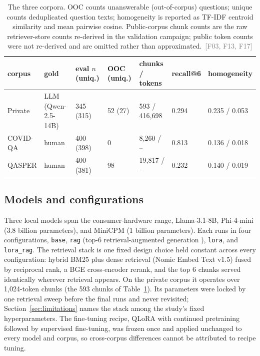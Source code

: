 \documentclass[11pt]{article}
\newcommand{\rcpt}[1]{\textcolor{gray}{\,\textsf{\scriptsize[#1]}}}
\begin{document}
\begin{table}[tbp]
  \centering
  \small
  \caption{The three corpora. OOC counts unanswerable (out-of-corpus) questions; unique counts deduplicated question texts; homogeneity is reported as TF-IDF centroid similarity and mean pairwise cosine. Public-corpus chunk counts are the raw retriever-store counts re-derived in the validation campaign; public token counts were not re-derived and are omitted rather than approximated. \rcpt{F03, F13, F17}}
  \label{tab:corpora}
  \setlength{\tabcolsep}{3.5pt}
  \footnotesize
  \begin{tabular}{lllllll}
    \toprule
    corpus & gold & eval $n$ (uniq.) & OOC (uniq.) & chunks / tokens & recall@6 & homogeneity \\
    \midrule
    Private  & LLM (Qwen-2.5-14B) & 345 (315) & 52 (27) & 593 / 416{,}698 & 0.294 & 0.235 / 0.053 \\
    COVID-QA & human              & 400 (398) & 0       & 8{,}260 / --    & 0.813 & 0.136 / 0.018 \\
    QASPER   & human              & 400 (381) & 98      & 19{,}817 / --   & 0.232 & 0.140 / 0.019 \\
    \bottomrule
  \end{tabular}
\end{table}

\subsection{Models and configurations}
Three local models span the consumer-hardware range, Llama-3.1-8B, Phi-4-mini (3.8 billion parameters), and MiniCPM (1 billion parameters). Each runs in four configurations, \texttt{base}, \texttt{rag} (top-6 retrieval-augmented generation \citep{lewis2020rag}), \texttt{lora}, and \texttt{lora\_rag}. The retrieval stack is one fixed design choice held constant across every configuration: hybrid BM25 plus dense retrieval (Nomic Embed Text v1.5) fused by reciprocal rank, a BGE cross-encoder rerank, and the top 6 chunks served identically wherever retrieval appears. On the private corpus it operates over 1{,}024-token chunks (the 593 chunks of Table~\ref{tab:corpora}). Its parameters were locked by one retrieval sweep before the final runs and never revisited; Section~\ref{sec:limitations} names the stack among the study's fixed hyperparameters. The fine-tuning recipe, QLoRA \citep{dettmers2023qlora, hu2022lora} with continued pretraining followed by supervised fine-tuning, was frozen once and applied unchanged to every model and corpus, so cross-corpus differences cannot be attributed to recipe tuning.
\end{document}
